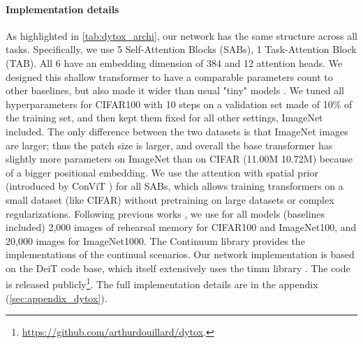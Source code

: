\paragraph{Implementation details} As highlighted in \autoref{tab:dytox_archi}, our network has the same
structure across all tasks. Specifically, we use 5 Self-Attention Blocks (SABs), 1 Task-Attention
Block (TAB). All 6 have an embedding dimension of 384 and 12 attention heads. We designed this
shallow transformer to have a comparable parameters count to other baselines, but also made it wider
than usual "tiny" models \citep{dosovitskiy2020vit,touvron2021deit,touvron2021cait}. We tuned all
hyperparameters for CIFAR100 with 10 steps on a validation set made of 10\% of the training set, and
then kept them fixed for all other settings, ImageNet included. The only difference between the two
datasets is that ImageNet images are larger; thus the patch size is larger, and overall the base
transformer has slightly more parameters on ImageNet than on CIFAR (11.00M \vs 10.72M) because of a
bigger positional embedding. We use the attention with spatial prior (introduced by ConViT
\citep{dascoli2021convit}) for all SABs, which allows training transformers on a small dataset (like
CIFAR) without pretraining on large datasets or complex regularizations. Following previous works
\citep{rebuffi2017icarl,yan2021der}, we use for all models (baselines included) 2,000 images of
rehearsal memory for CIFAR100 and ImageNet100, and 20,000 images for ImageNet1000. The Continuum
library \citep{douillardlesort2021continuum} provides the implementations of the continual
scenarios. Our network implementation is based on the DeiT \citep{touvron2021deit} code base, which
itself extensively uses the timm library \citep{wightman2019timm}. The code is released
publicly\footnote{\footnotesize{\url{https://github.com/arthurdouillard/dytox}.}}. The full
implementation details are in the appendix (\autoref{sec:appendix_dytox}).


